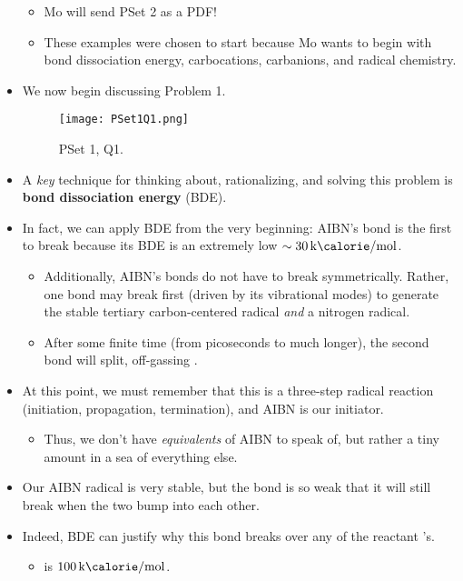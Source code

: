 \documentclass[../notes.tex]{subfiles}
\begin{document}
\begin{itemize}
\begin{itemize}
\begin{itemize}
        \end{itemize}
        \item Mo will send PSet 2 as a PDF!
        \item These examples were chosen to start because Mo wants to begin with bond dissociation energy, carbocations, carbanions, and radical chemistry.
    \end{itemize}
    \item We now begin discussing Problem 1.
    \begin{figure}[H]
        \centering
        \texttt{[image: PSet1Q1.png]}
        \caption{PSet 1, Q1.}
        \label{fig:PSet1Q1}
    \end{figure}
    \item A \emph{key} technique for thinking about, rationalizing, and solving this problem is \textbf{bond dissociation energy} (BDE).
    \item In fact, we can apply BDE from the very beginning: AIBN's  bond is the first to break because its BDE is an extremely low $\sim\SI{30}{\kilo\calorie\per\mole}$.
    \begin{itemize}
        \item Additionally, AIBN's  bonds do not have to break symmetrically. Rather, one bond may break first (driven by its vibrational modes) to generate the stable tertiary carbon-centered radical \emph{and} a nitrogen radical.
        \item After some finite time (from picoseconds to much longer), the second  bond will split, off-gassing .
    \end{itemize}
    \item At this point, we must remember that this is a three-step radical reaction (initiation, propagation, termination), and AIBN is our initiator.
    \begin{itemize}
        \item Thus, we don't have \emph{equivalents} of AIBN to speak of, but rather a tiny amount in a sea of everything else.
    \end{itemize}
    \item Our AIBN radical is very stable, but the  bond is so weak that it will still break when the two bump into each other.
    \item Indeed, BDE can justify why this bond breaks over any of the reactant 's.
    \begin{itemize}
        \item {} is $\SI{100}{\kilo\calorie\per\mole}$.

\end{itemize}
\end{itemize}
\end{document}
